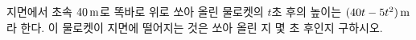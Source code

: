 지면에서 초속 $40\mkern3mu \mathrm{m}$로 똑바로 위로 쏘아 올린 물로켓의 $t$초 후의 높이는 $(40t-5t^2)\mkern3mu \mathrm{m}$라 한다. 이 물로켓이 지면에 떨어지는 것은 쏘아 올린 지 몇 초 후인지 구하시오.
